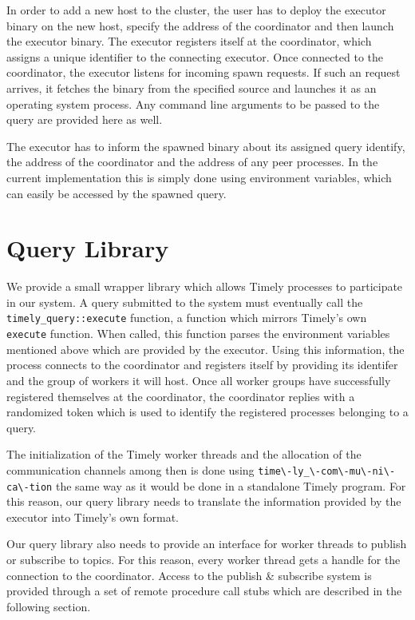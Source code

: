 In order to add a new host to the cluster, the user has to deploy the executor
binary on the new host, specify the address of the coordinator and then launch
the executor binary. The executor registers itself at the coordinator, which
assigns a unique identifier to the connecting executor. Once connected to the
coordinator, the executor listens for incoming spawn requests. If such an
request arrives, it fetches the binary from the specified source and launches
it as an operating system process. Any command line arguments to be passed
to the query are provided here as well.

The executor has to inform the spawned binary about its assigned query identify,
the address of the coordinator and the address of any peer processes. In the
current implementation this is simply done using environment variables, which
can easily be accessed by the spawned query.


\section{Query Library}

We provide a small wrapper library which allows Timely processes to participate
in our system. A query submitted to the system must eventually call the 
\lstinline{timely_query::execute} function, a function which mirrors Timely's
own \lstinline{execute} function. When called, this function parses the
environment variables mentioned above which are provided by the executor.
Using this information, the process connects to the coordinator and registers
itself by providing its identifer and the group of workers it will host. Once
all worker groups have successfully registered themselves at the coordinator,
the coordinator replies with a randomized token which is used to identify
the registered processes belonging to a query. 

The initialization of the Timely worker threads and the allocation of the
communication channels among then is done using \lstinline{time\-ly_\-com\-mu\-ni\-ca\-tion}
the same way as it would be done in a standalone Timely program. For this
reason, our query library needs to translate the information provided by the
executor into Timely's own format.

Our query library also needs to provide an interface for worker threads to
publish or subscribe to topics. For this reason, every worker thread gets
a handle for the connection to the coordinator. Access to the
publish \& subscribe system is provided through a set of remote
procedure call stubs which are described in the following section.

